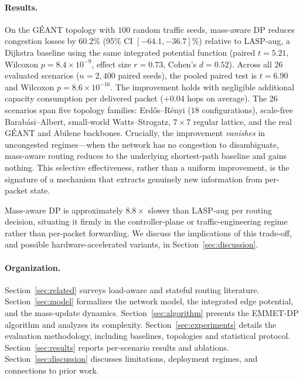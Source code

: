 \paragraph{Results.}
On the GÉANT topology with $100$ random traffic seeds, mass-aware
DP reduces congestion losses by $60.2\%$ (95\% CI $[-64.1, -36.7]$\%)
relative to LASP-aug, a Dijkstra baseline using the same integrated
potential function (paired $t = 5.21$, Wilcoxon $p = 8.4\times 10^{-9}$,
effect size $r = 0.73$, Cohen's $d = 0.52$). Across all 26 evaluated
scenarios ($n = 2{,}400$ paired seeds), the pooled paired test is
$t = 6.90$ and Wilcoxon $p = 8.6\times 10^{-16}$. The
improvement holds with negligible additional capacity consumption
per delivered packet ($+0.04$ hops on average). The 26 scenarios
span five topology families: Erd\H{o}s--R\'enyi
($18$ configurations), scale-free Barab\'asi--Albert,
small-world Watts--Strogatz, $7\times 7$ regular lattice, and the
real GÉANT and Abilene backbones. Crucially, the improvement
\emph{vanishes} in uncongested regimes---when the network has no
congestion to disambiguate, mass-aware routing reduces to the
underlying shortest-path baseline and gains nothing. This
selective effectiveness, rather than a uniform improvement, is
the signature of a mechanism that extracts genuinely new
information from per-packet state.

Mass-aware DP is approximately $8.8\times$ slower than LASP-aug
per routing decision, situating it firmly in the controller-plane
or traffic-engineering regime rather than per-packet forwarding.
We discuss the implications of this trade-off, and possible
hardware-accelerated variants, in Section~\ref{sec:discussion}.

\paragraph{Organization.}
Section~\ref{sec:related} surveys load-aware and stateful routing
literature.  Section~\ref{sec:model} formalizes the network model,
the integrated edge potential, and the mass-update dynamics.
Section~\ref{sec:algorithm} presents the EMMET-DP algorithm
and analyzes its complexity. Section~\ref{sec:experiments} details
the evaluation methodology, including baselines, topologies and
statistical protocol. Section~\ref{sec:results} reports per-scenario
results and ablations. Section~\ref{sec:discussion} discusses
limitations, deployment regimes, and connections to prior work.

